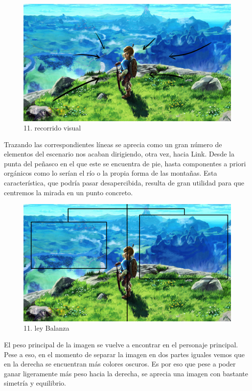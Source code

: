 \documentclass[12pt]{article}
\begin{document}
  \begin{figure}[H]
    \centering
    \includegraphics[width=\textwidth]{images/Carlos/15/Flechas.jpg}
    \caption{\small 11. recorrido visual}
  \end{figure}
  Trazando las correspondientes líneas se aprecia como un gran número de elementos del escenario nos acaban dirigiendo, otra vez, hacia Link. Desde la punta del peñasco en el que este se encuentra de pie, hasta componentes a priori orgánicos como lo serían el río o la propia forma de las montañas. Esta característica, que podría pasar desapercibida, resulta de gran utilidad para que centremos la mirada en un punto concreto.

  \begin{figure}[H]
    \centering
    \includegraphics[width=\textwidth]{images/Carlos/15/Balanza.jpg}
    \caption{\small 11. ley Balanza}
  \end{figure}
  El peso principal de la imagen se vuelve a encontrar en el personaje principal. Pese a eso, en el momento de separar la imagen en dos partes iguales vemos que en la derecha se encuentran más colores oscuros. Es por eso que pese a poder ganar ligeramente más peso hacia la derecha, se aprecia una imagen con bastante simetría y equilibrio.
\end{document}
